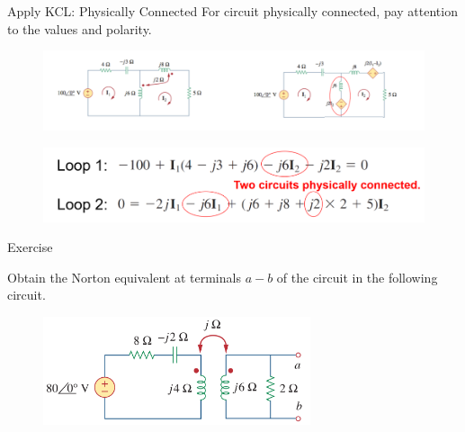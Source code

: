 \documentclass{beamer}
\begin{document}
\begin{frame}{Apply KCL: Physically Connected} %
For circuit physically connected, pay attention to the values and polarity.
\begin{figure}[H]
        \centering
        \includegraphics[width=1\textwidth]{C13/5.png}
    \end{figure}
    \begin{figure}[H]
        \centering
        \includegraphics[width=1\textwidth]{C13/6.png}
    \end{figure}
\end{frame}


\begin{frame}{Exercise}

Obtain the Norton equivalent at terminals $a-b$ of the circuit in the following circuit.

\begin{figure}[H]
        \centering
        \includegraphics[width=0.7\textwidth]{C13/11.png}
    \end{figure}
\end{frame}

\end{document}
